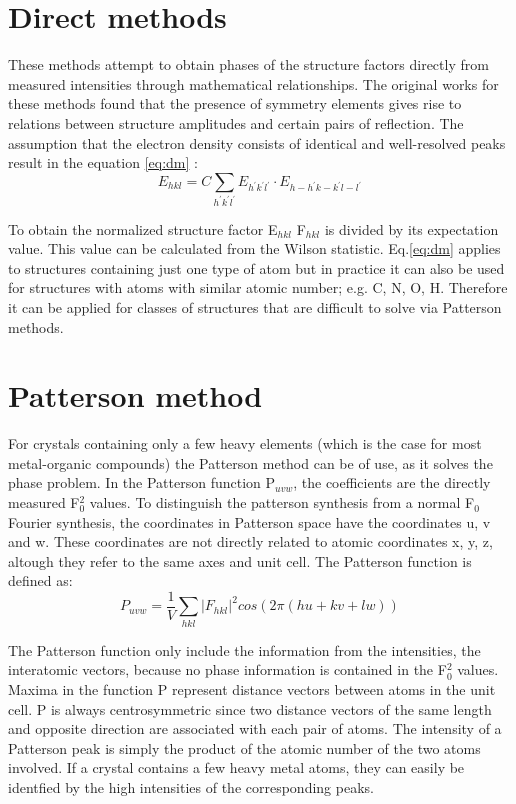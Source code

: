 \section{Direct methods}
These methods attempt to obtain phases of the structure factors directly from measured intensities through mathematical relationships. The original works for these methods  \cite{harker48} found that the presence of symmetry elements gives rise to relations between structure amplitudes and certain pairs of reflection. The assumption that the electron density consists of identical and well-resolved peaks result in the equation \ref{eq:dm} \cite{sayre}:
\begin{equation}
E_{hkl} = C \sum_{h^{'}k^{'}l^{'}}E_{h^{'} k^{'} l^{'}} \cdot E_{h-h^{'} k-k^{'} l-l^{'}}
\label{eq:dm}
\end{equation}

To obtain the normalized structure factor E$_{hkl}$ F$_{hkl}$ is divided by its expectation value. This value can be calculated from the Wilson statistic. \cite{wilson}  Eq.\ref{eq:dm} applies to structures containing just one type of atom but in practice it can also be used for structures with atoms with similar atomic number; e.g. C, N, O, H. Therefore it can be applied for classes of structures that are difficult to solve via Patterson methods.



\section{Patterson method}
For crystals containing only a few heavy elements (which is the case for most metal-organic compounds) the Patterson method can be of use, as it  solves the phase problem.
In the Patterson function P$_{uvw}$, the coefficients are the directly measured F$_0^2$ values. To distinguish the patterson synthesis from a normal F$_0$ Fourier synthesis, the coordinates in Patterson space have the coordinates u, v and w. These 
coordinates are not directly related to atomic coordinates x, y, z, altough they refer to the same axes and unit cell. 
The Patterson function is defined as:
\begin{equation}
P_{uvw}= \frac{1}{V} \sum \limits _{hkl}\left|F_{hkl}\right|^{2} cos(2\pi(hu + kv + lw))
\end{equation}

The Patterson function only include the information  from the intensities, the interatomic vectors, because no phase information is contained in the F$_0^2$ values.  \cite{patterson}\\

Maxima in the function P represent distance vectors between atoms in the unit cell. P is always centrosymmetric since two distance vectors of the same length and opposite direction are associated with each pair of atoms. The intensity of a Patterson peak is simply the product of the atomic number of the two atoms involved. If a crystal contains a few heavy metal atoms, they can easily be identfied by the high intensities of the corresponding peaks. 


